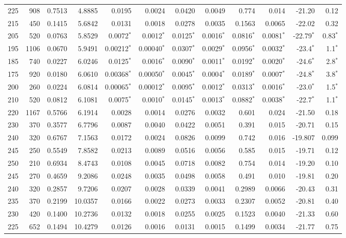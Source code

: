 \begin{landscape}
\begin{footnotesize}
\begin{longtable}{@{\extracolsep{\fill}}r r r r r r r r r r r r}
225 & 908 & 0.7513 & 4.8885 & 0.0195 & 0.0024 & 0.0420 & 0.0049 & 0.774 & 0.014 & -21.20 & 0.12 \\
215 & 450 & 0.1415 & 5.6842 & 0.0131 & 0.0018 & 0.0278 & 0.0035 & 0.1563 & 0.0065 & -22.02 & 0.32 \\
205 & 520 & 0.0763 & 5.8529 & 0.0072$^*$ & 0.0012$^*$ & 0.0125$^*$ & 0.0016$^*$ & 0.0816$^*$ & 0.0081$^*$ & -22.79$^*$ & 0.83$^*$ \\
195 & 1106 & 0.0670 & 5.9491 & 0.00212$^*$ & 0.00040$^*$ & 0.0307$^*$ & 0.0029$^*$ & 0.0956$^*$ & 0.0032$^*$ & -23.4$^*$ & 1.1$^*$ \\
185 & 740 & 0.0227 & 6.0246 & 0.0125$^*$ & 0.0016$^*$ & 0.0090$^*$ & 0.0011$^*$ & 0.0192$^*$ & 0.0020$^*$ & -24.6$^*$ & 2.8$^*$ \\
175 & 920 & 0.0180 & 6.0610 & 0.00368$^*$ & 0.00050$^*$ & 0.0045$^*$ & 0.0004$^*$ & 0.0189$^*$ & 0.0007$^*$ & -24.8$^*$ & 3.8$^*$ \\
200 & 260 & 0.0224 & 6.0814 & 0.00065$^*$ & 0.00012$^*$ & 0.0095$^*$ & 0.0012$^*$ & 0.0313$^*$ & 0.0016$^*$ & -23.0$^*$ & 1.5$^*$ \\
210 & 520 & 0.0812 & 6.1081 & 0.0075$^*$ & 0.0010$^*$ & 0.0145$^*$ & 0.0013$^*$ & 0.0882$^*$ & 0.0038$^*$ & -22.7$^*$ & 1.1$^*$ \\
220 & 1167 & 0.5766 & 6.1914 & 0.0028 & 0.0014 & 0.0276 & 0.0032 & 0.601 & 0.024 & -21.50 & 0.18 \\
230 & 370 & 0.3577 & 6.7796 & 0.0087 & 0.0040 & 0.0422 & 0.0051 & 0.391 & 0.015 & -20.71 & 0.15 \\
240 & 320 & 0.6767 & 7.1563 & 0.0172 & 0.0024 & 0.0826 & 0.0099 & 0.742 & 0.016 & -19.807 & 0.099 \\
245 & 250 & 0.5549 & 7.8582 & 0.0213 & 0.0089 & 0.0516 & 0.0056 & 0.585 & 0.015 & -19.71 & 0.12 \\
250 & 210 & 0.6934 & 8.4743 & 0.0108 & 0.0045 & 0.0718 & 0.0082 & 0.754 & 0.014 & -19.20 & 0.10 \\
245 & 270 & 0.4659 & 9.2086 & 0.0248 & 0.0035 & 0.0498 & 0.0058 & 0.491 & 0.010 & -19.81 & 0.20 \\
240 & 320 & 0.2857 & 9.7206 & 0.0207 & 0.0028 & 0.0339 & 0.0041 & 0.2989 & 0.0066 & -20.43 & 0.31 \\
235 & 370 & 0.2199 & 10.0357 & 0.0166 & 0.0022 & 0.0273 & 0.0033 & 0.2307 & 0.0052 & -20.81 & 0.40 \\
230 & 420 & 0.1400 & 10.2736 & 0.0132 & 0.0018 & 0.0255 & 0.0025 & 0.1523 & 0.0040 & -21.33 & 0.60 \\
225 & 652 & 0.1494 & 10.4279 & 0.0126 & 0.0016 & 0.0131 & 0.0015 & 0.1499 & 0.0034 & -21.77 & 0.75 \\

\end{longtable}
\end{footnotesize}
\end{landscape}
